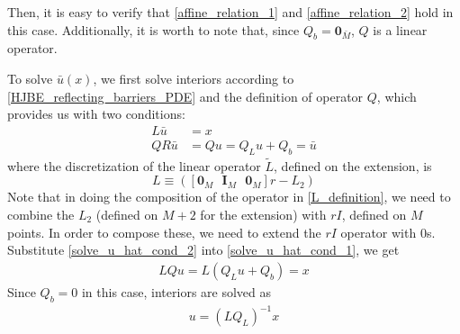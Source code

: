 \documentclass[11pt]{article}
\begin{document}
Then, it is easy to verify that \cref{affine_relation_1} and \cref{affine_relation_2} hold in this case. Additionally, it is worth to note that, since $Q_b = \mathbf{0}_{\bar{M}}$, $Q$ is a linear operator.

To solve $\bar{u}(x)$, we first solve interiors according to \cref{HJBE_reflecting_barriers_PDE} and the definition of operator $Q$, which provides us with two conditions:
\begin{align}
L \bar{u} &= x\label{solve_u_hat_cond_1}\\
Q R\bar{u} &= Q u = Q_L u+Q_b = \bar{u}\label{solve_u_hat_cond_2}
\end{align}
where the discretization of the linear operator $\tilde{L}$, defined on the extension, is
\begin{equation}
L \equiv ([\mathbf{0}_{M} \text{ } \mathbf{I}_{M} \text{ } \mathbf{0}_{M}] r - L_2)
\label{L_definition}
\end{equation}
Note that in doing the composition of the operator in \cref{L_definition}, we need to combine the $L_2$ (defined on $M+2$ for the extension) with $r I$, defined on $M$ points.  In order to compose these, we need to extend the $r I$ operator with $0$s.
Substitute \cref{solve_u_hat_cond_2} into \cref{solve_u_hat_cond_1}, we get
\begin{align}
L Q u = L (Q_L u+Q_b) = x
\end{align}
Since $Q_b = 0$ in this case, interiors are solved as
\begin{align}
u = (L Q_L)^{-1}x\label{solve_u_hat_in_terms_of_interiors}
\end{align}
\end{document}
